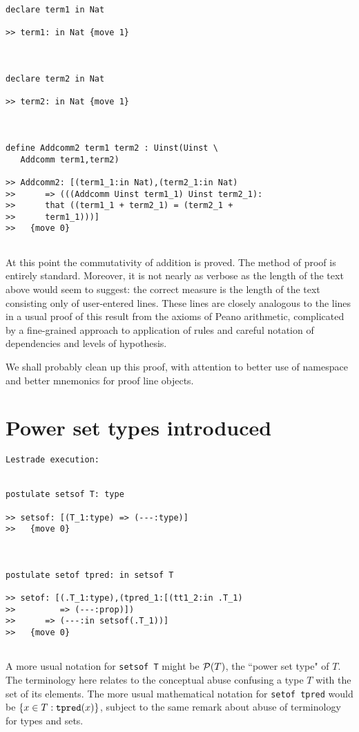 \documentclass[12pt]{article}
\begin{document}
\begin{verbatim}
declare term1 in Nat

>> term1: in Nat {move 1}



declare term2 in Nat

>> term2: in Nat {move 1}



define Addcomm2 term1 term2 : Uinst(Uinst \
   Addcomm term1,term2)

>> Addcomm2: [(term1_1:in Nat),(term2_1:in Nat)
>>      => (((Addcomm Uinst term1_1) Uinst term2_1):
>>      that ((term1_1 + term2_1) = (term2_1 +
>>      term1_1)))]
>>   {move 0}


\end{verbatim}

At this point the commutativity of addition is proved.  The method of proof is entirely standard.  Moreover, it is not nearly as verbose as the length of the text above would seem to suggest:  the correct measure is the length of the text consisting only of user-entered lines.  These lines are closely analogous to the lines in a usual proof of this result from the axioms of Peano arithmetic, complicated by a fine-grained approach to application of rules and careful notation of dependencies and levels of hypothesis.

We shall probably clean up this proof, with attention to better use of namespace and better mnemonics for proof line objects.

\section{Power set types introduced}

\begin{verbatim}Lestrade execution:


postulate setsof T: type

>> setsof: [(T_1:type) => (---:type)]
>>   {move 0}



postulate setof tpred: in setsof T

>> setof: [(.T_1:type),(tpred_1:[(tt1_2:in .T_1)
>>         => (---:prop)])
>>      => (---:in setsof(.T_1))]
>>   {move 0}


\end{verbatim}

A more usual notation for {\tt setsof T} might be ${\cal P}(T)$, the ``power set type" of $T$.  The terminology here relates to the conceptual abuse confusing a type $T$ with the set of its elements.  The more usual mathematical notation for {\tt setof tpred} would be $\{x \in T:{\tt tpred}(x)\}$, subject to the same remark about abuse of terminology for types and sets.
\end{document}
